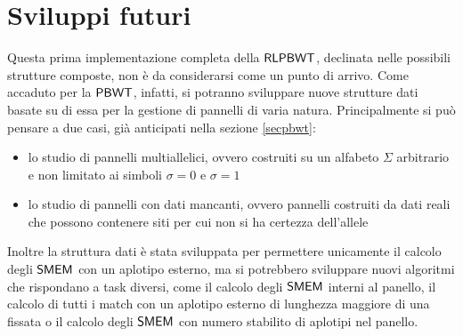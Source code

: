 \section{Sviluppi futuri}
Questa prima implementazione completa della $\mbox{\rm {\sf RLPBWT}}$,
declinata nelle possibili strutture composte, non è da
considerarsi come un punto di arrivo. Come accaduto per la $\mbox{\rm {\sf PBWT}}$,
infatti, si potranno sviluppare nuove strutture dati basate su di essa per la
gestione di pannelli di varia natura. Principalmente si può pensare a due casi,
già anticipati nella sezione \ref{secpbwt}:
\begin{itemize}
  \item lo studio di pannelli multiallelici, ovvero costruiti su un alfabeto
  $\Sigma$ arbitrario e non limitato ai simboli $\sigma=0$ e $\sigma=1$
  \item lo studio di pannelli con dati mancanti, ovvero pannelli costruiti
  da dati reali che possono contenere siti per cui non si ha certezza
  dell'allele  
\end{itemize}
Inoltre la struttura dati è stata sviluppata per permettere
unicamente il calcolo degli $\mbox{\rm {\sf SMEM}}$ con un aplotipo esterno, ma
si potrebbero sviluppare nuovi algoritmi che
rispondano a task diversi, come il calcolo degli $\mbox{\rm {\sf SMEM}}$ interni al
panello, il calcolo di tutti i match con
un aplotipo esterno di lunghezza maggiore di una fissata o il calcolo degli
$\mbox{\rm {\sf SMEM}}$ con numero stabilito di aplotipi nel panello.
